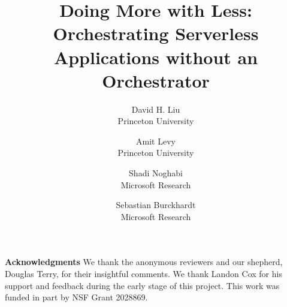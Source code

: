\documentclass[letterpaper,twocolumn,10pt]{article}
\newcommand{\name}{Unum}
\begin{document}

\date{}

\title{Doing More with Less: \\ Orchestrating Serverless Applications
without an Orchestrator}

\author{
{\rm David H. Liu}\\
Princeton University
\and
{\rm Amit Levy}\\
Princeton University
\and
{\rm Shadi Noghabi}\\
Microsoft Research
\and
{\rm Sebastian Burckhardt}\\
Microsoft Research
} %

\maketitle
\thispagestyle{empty}

\abstract{}








\setlength{\parindent}{0pt}
\setlength{\parskip}{1pt plus2pt}
\par
\textbf{Acknowledgments} We thank the anonymous reviewers and our shepherd,
Douglas Terry, for their insightful comments. We thank Landon Cox for his
support and feedback during the early stage of this project. This work was
funded in part by NSF Grant 2028869.
\setlength{\parindent}{10pt}
\setlength{\parskip}{0pt plus1pt}



\end{document}
